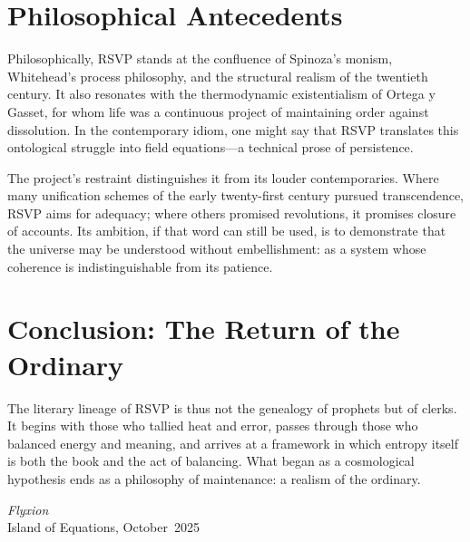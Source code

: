 \documentclass[12pt]{article}
\begin{document}
\section{Philosophical Antecedents}

Philosophically, RSVP stands at the confluence of Spinoza's monism, Whitehead's process philosophy, and the structural realism of the twentieth century. 
It also resonates with the thermodynamic existentialism of Ortega y Gasset, for whom life was a continuous project of maintaining order against dissolution. 
In the contemporary idiom, one might say that RSVP translates this ontological struggle into field equations---a technical prose of persistence.

The project's restraint distinguishes it from its louder contemporaries. 
Where many unification schemes of the early twenty-first century pursued transcendence, RSVP aims for adequacy; where others promised revolutions, it promises closure of accounts. 
Its ambition, if that word can still be used, is to demonstrate that the universe may be understood without embellishment: as a system whose coherence is indistinguishable from its patience.

\section{Conclusion: The Return of the Ordinary}

The literary lineage of RSVP is thus not the genealogy of prophets but of clerks. 
It begins with those who tallied heat and error, passes through those who balanced energy and meaning, and arrives at a framework in which entropy itself is both the book and the act of balancing. 
What began as a cosmological hypothesis ends as a philosophy of maintenance: a realism of the ordinary.

\begin{flushright}
\textit{Flyxion}\\
\small Island of Equations, October~2025
\end{flushright}
\end{document}
